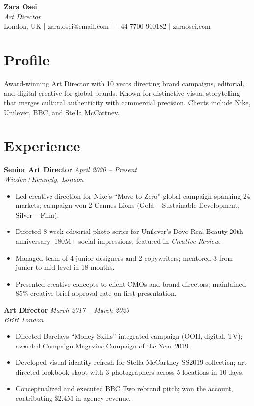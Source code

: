 \documentclass[11pt,a4paper]{article}
\begin{document}
\begin{center}
  {\LARGE \textbf{Zara Osei}}\\[3pt]
  {\large \textit{Art Director}}\\[4pt]
  London, UK \quad|\quad
  \href{mailto:zara.osei@email.com}{zara.osei@email.com} \quad|\quad
  +44 7700 900182 \quad|\quad
  \href{https://zaraosei.com}{zaraosei.com}
\end{center}

\section{Profile}
Award-winning Art Director with 10 years directing brand campaigns, editorial, and digital creative for global brands. Known for distinctive visual storytelling that merges cultural authenticity with commercial precision. Clients include Nike, Unilever, BBC, and Stella McCartney.

\section{Experience}

\noindent\textbf{Senior Art Director} \hfill \textit{April 2020 -- Present}\\
\textit{Wieden+Kennedy, London}
\begin{itemize}
  \item Led creative direction for Nike's ``Move to Zero'' global campaign spanning 24 markets; campaign won 2 Cannes Lions (Gold -- Sustainable Development, Silver -- Film).
  \item Directed 8-week editorial photo series for Unilever's Dove Real Beauty 20th anniversary; 180M+ social impressions, featured in \textit{Creative Review}.
  \item Managed team of 4 junior designers and 2 copywriters; mentored 3 from junior to mid-level in 18 months.
  \item Presented creative concepts to client CMOs and brand directors; maintained 85\% creative brief approval rate on first presentation.
\end{itemize}

\vspace{4pt}
\noindent\textbf{Art Director} \hfill \textit{March 2017 -- March 2020}\\
\textit{BBH London}
\begin{itemize}
  \item Directed Barclays ``Money Skills'' integrated campaign (OOH, digital, TV); awarded Campaign Magazine Campaign of the Year 2019.
  \item Developed visual identity refresh for Stella McCartney SS2019 collection; art directed lookbook shoot with 3 photographers across 5 locations in 10 days.
  \item Conceptualized and executed BBC Two rebrand pitch; won the account, contributing \$2.4M in agency revenue.
\end{itemize}
\end{document}
